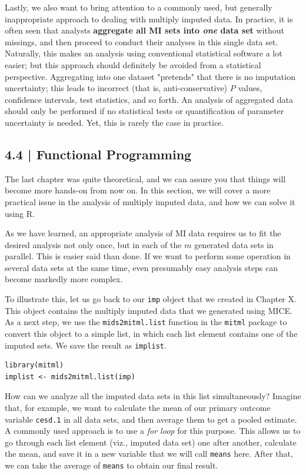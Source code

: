 Lastly, we also want to bring attention to a commonly used, but generally inappropriate approach to dealing with multiply imputed data. In practice, it is often seen that analysts \textbf{aggregate all MI sets into \emph{one} data set} without missings, and then proceed to conduct their analyses in this single data set. Naturally, this makes an analysis using conventional statistical software a lot easier; but this approach should definitely be avoided from a statistical perspective. Aggregating into one dataset "pretends" that there is no imputation uncertainty; this leads to incorrect (that is, anti-conservative) $P$ values, confidence intervals, test statistics, and so forth. An analysis of aggregated data should only be performed if no statistical tests or quantification of parameter uncertainty is needed. Yet, this is rarely the case in practice.

\subsection{{\normalfont\textsf{\textcolor{sBlue}{\small 4.4 |}}} Functional Programming}

The last chapter was quite theoretical, and we can assure you that things will become more hands-on from now on. In this section, we will cover a more practical issue in the analysis of multiply imputed data, and how we can solve it using \textsf{R}. 

As we have learned, an appropriate analysis of MI data requires us to fit the desired analysis not only once, but in each of the $m$ generated data sets in parallel. This is easier said than done. If we want to perform some operation in several data sets at the same time, even presumably easy analysis steps can become markedly more complex.

To illustrate this, let us go back to our \texttt{imp} object that we created in Chapter X. This object contains the multiply imputed data that we generated using \textsf{MICE}. As a next step, we use the \texttt{mids2mitml.list} function in the \texttt{mitml} package to convert this object to a simple list, in which each list element contains one of the imputed sets. We save the result as \texttt{implist}.

\begin{lstlisting}
library(mitml)
implist <- mids2mitml.list(imp)
\end{lstlisting}

How can we analyze all the imputed data sets in this list simultaneously? Imagine that, for example, we want to calculate the mean of our primary outcome variable \texttt{cesd.1} in all data sets, and then average them to get a pooled estimate. A commonly used approach is to use a \emph{for loop} for this purpose. This allows us to go through each list element (viz., imputed data set) one after another, calculate the mean, and save it in a new variable that we will call \texttt{means} here. After that, we can take the average of \texttt{means} to obtain our final result.

